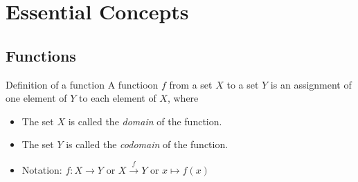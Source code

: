
\chapter{Essential Concepts}

\section{Functions}
\begin{mybox}{Definition of a function}
	A functioon $f $ from a set $X $ to a set $Y $ is an assignment of one element of $Y$ to each element of $X$, where
	\begin{itemize}
		\item The set $X$ is called the \emph{domain} of the function.
		\item The set $Y$ is called the \emph{codomain} of the function.
	\item Notation: $f: X \rightarrow Y$ or $X {\overset{f}{\to}} Y$ or $x\mapsto f(x)$
	\end{itemize}
\end{mybox}
